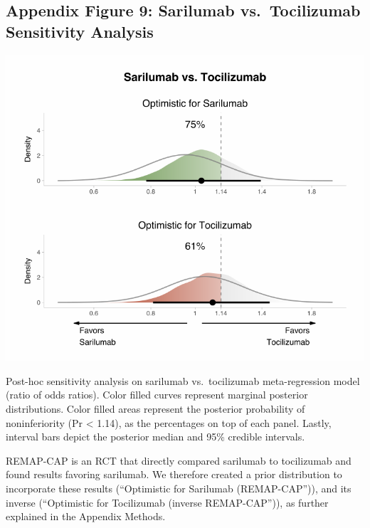 \documentclass[
  12pt,
]{article}
\begin{document}
\restoregeometry

\newpage

\hypertarget{appendix-figure-9-sarilumab-vs.-tocilizumab-sensitivity-analysis}{%
\subsection{Appendix Figure 9: Sarilumab vs.~Tocilizumab Sensitivity
Analysis}\label{appendix-figure-9-sarilumab-vs.-tocilizumab-sensitivity-analysis}}

\begin{center}\includegraphics{supplementary_material_files/figure-latex/meta regressions sensitivity plot display-1} \end{center}

Post-hoc sensitivity analysis on sarilumab vs.~tocilizumab
meta-regression model (ratio of odds ratios). Color filled curves
represent marginal posterior distributions. Color filled areas represent
the posterior probability of noninferiority (Pr \textless{} 1.14), as
the percentages on top of each panel. Lastly, interval bars depict the
posterior median and 95\% credible intervals.

REMAP-CAP is an RCT that directly compared sarilumab to tocilizumab and
found results favoring sarilumab. We therefore created a prior
distribution to incorporate these results (``Optimistic for Sarilumab
(REMAP-CAP'')), and its inverse (``Optimistic for Tocilizumab (inverse
REMAP-CAP'')), as further explained in the Appendix Methods.
\end{document}
